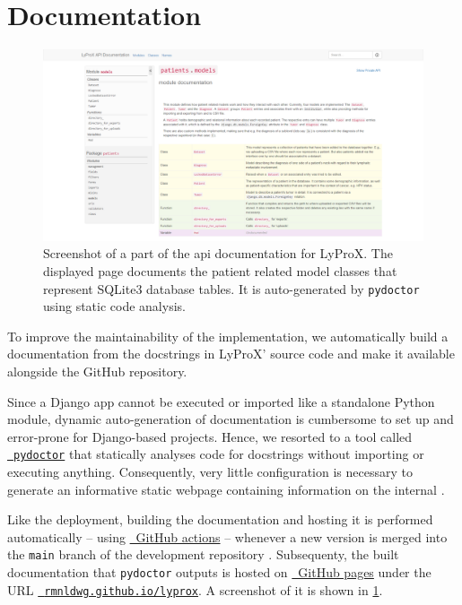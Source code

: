 \documentclass[\relativeRoot/main.tex]{subfiles}
\begin{document}
\section{Documentation}
\label{sec:lyprox:documentation}

\begin{figure}
    \centering
    \includegraphics[width=\textwidth, frame]{figures/docs.png}
    \caption[
        Documentation for LyProX
    ]{
        Screenshot of a part of the \acrshort{api} documentation for LyProX. The displayed page documents the patient related model classes that represent SQLite3 database tables. It is auto-generated by \texttt{pydoctor} \cite{hudson_pydoctor_2022} using static code analysis.
    }
    \label{fig:lyprox:documentation}
\end{figure}

To improve the maintainability of the implementation, we automatically build a documentation from the docstrings in LyProX' source code and make it available alongside the GitHub repository.

Since a Django app cannot be executed or imported like a standalone Python module, dynamic auto-generation of documentation is cumbersome to set up and error-prone for Django-based projects. Hence, we resorted to a tool called \href{https://pydoctor.readthedocs.io/en/latest/}{~\texttt{pydoctor}} \cite{hudson_pydoctor_2022} that statically analyses code for docstrings without importing or executing anything. Consequently, very little configuration is necessary to generate an informative static webpage containing information on the internal .

Like the deployment, building the documentation and hosting it is performed automatically -- using \href{https://github.com/features/actions}{~GitHub actions} -- whenever a new version is merged into the \texttt{main} branch of the development repository . Subsequenty, the built documentation that \texttt{pydoctor} outputs is hosted on \href{https://pages.github.com/}{~GitHub pages} under the URL \href{https://rmnldwg.github.io/lyprox}{~\texttt{rmnldwg.github.io/lyprox}}. A screenshot of it is shown in \cref{fig:lyprox:documentation}.
\end{document}

